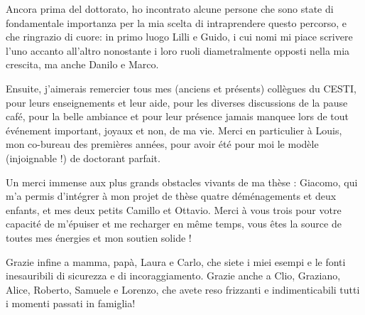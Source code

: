 Ancora prima del dottorato, ho incontrato alcune persone che sono state di fondamentale importanza per la mia scelta di intraprendere questo percorso, e che ringrazio di cuore: in primo luogo Lilli e Guido, i cui nomi mi piace scrivere l'uno accanto all'altro nonostante i loro ruoli diametralmente opposti nella mia crescita, ma anche Danilo e Marco.

Ensuite, j'aimerais remercier tous mes (anciens et présents) collègues du CESTI, pour leurs enseignements et leur aide, pour les diverses discussions de la pause café, pour la belle ambiance et pour leur présence jamais manquee lors de tout événement important, joyaux et non, de ma vie.  Merci en particulier à Louis, mon co-bureau des premières années, pour avoir été pour moi le modèle (injoignable !) de doctorant parfait.  

Un merci immense aux plus grands obstacles vivants de ma thèse : Giacomo, qui m'a permis d'intégrer à mon projet de thèse quatre déménagements et deux enfants, et mes deux petits Camillo et Ottavio. Merci à vous trois pour votre capacité de m'épuiser et me recharger en même temps, vous êtes la source de toutes mes énergies et mon soutien solide ! 

Grazie infine a mamma, papà, Laura e Carlo, che siete i miei esempi e le fonti inesauribili di sicurezza e di  incoraggiamento. Grazie anche a Clio, Graziano, Alice, Roberto, Samuele e Lorenzo, che avete reso frizzanti e indimenticabili tutti i momenti passati in famiglia!